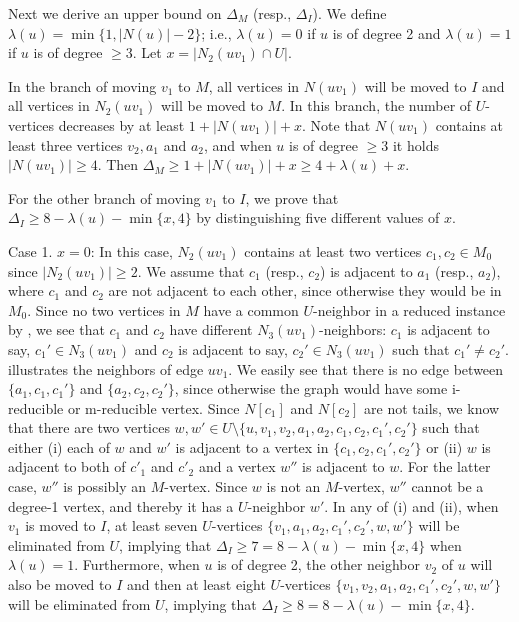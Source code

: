 \documentclass{elsart_TR2}
\begin{document}
Next we derive an upper bound on  $\Delta_M$ (resp., $\Delta_I$).
We define $\lambda(u)=\min\{1, |N(u)|-2\}$; i.e.,  $\lambda(u)= 0$ if $u$ is of degree 2
 and $\lambda(u)=1$ if $u$ is of degree $\geq 3$.
Let $x=|N_2(uv_1)\cap U|$.

In the branch of moving $v_1$ to $M$,  all vertices in $N(uv_1)$
will be moved to $I$ and all vertices in $N_2(uv_1)$ will be moved to $M$.
In this branch, the number of $U$-vertices decreases by at least $1+|N(uv_1)|+x$.
Note that $N(uv_1)$ contains at least three vertices $v_2, a_1$ and $a_2$,
and when $u$ is  of degree $\geq3$ it holds $|N(uv_1)|\geq 4$.
Then  $\Delta_M\geq 1+|N(uv_1)|+x\geq 4+\lambda(u)+x$.


For the other branch of moving $v_1$ to $I$, we prove that
$\Delta_I\geq 8-\lambda(u)-\min\{x,4\} $
 by distinguishing five different values of $x$.


Case 1. $x=0$: In this case, $N_2(uv_1)$ contains at least two vertices $c_1,c_2\in M_0$ since $|N_2(uv_1)|\geq 2$.
We assume that $c_1$ (resp., $c_2$) is adjacent to $a_1$ (resp., $a_2$),
where  $c_1$ and $c_2$ are not adjacent to each other, since otherwise they would be in $M_0$.
Since  no two vertices in $M$  have a common $U$-neighbor in a reduced instance by ,
we see that $c_1$ and $c_2$ have different $N_3(uv_1)$-neighbors:  $c_1$ is adjacent to say, $c_1'\in N_3(uv_1)$
 and $c_2$ is adjacent to say, $c_2'\in N_3(uv_1)$ such that $c_1'\neq c_2'$.
 illustrates the neighbors of edge $uv_1$.
We easily see that there is no edge between $\{a_1,c_1,c_1'\}$ and $\{a_2,c_2,c_2'\}$, since otherwise
 the graph would have  some i-reducible or m-reducible vertex.
Since $N[c_1]$ and $N[c_2]$ are not tails, we know that there are two vertices $w,w'\in U\setminus \{u,v_1,v_2,a_1,a_2,c_1,c_2,c_1',c_2'\}$ such that either
(i) each of $w$ and $w'$ is adjacent to a vertex in $\{c_1,c_2,c_1',c_2'\}$ or
(ii) $w$ is adjacent to both of $c'_1$ and $c'_2$ and a vertex $w''$ is adjacent to $w$.
For the latter case, $w''$ is possibly an $M$-vertex.
Since $w$ is not an $M$-vertex, $w''$ cannot be
a degree-1 vertex, and thereby it has a $U$-neighbor $w'$.
In any of (i) and (ii), when $v_1$ is moved to $I$, at least seven $U$-vertices $\{v_1,a_1,a_2,c_1',c_2',w,w'\}$ will be eliminated from $U$, implying that $\Delta_I\geq 7=8-\lambda(u)-\min\{x,4\}$ when $\lambda(u)=1$.
Furthermore, when $u$ is of degree 2, the other neighbor $v_2$ of $u$ will also be moved to $I$ and
then at least eight $U$-vertices $\{v_1,v_2,a_1,a_2,c_1',c_2',w,w'\}$ will be eliminated from $U$,
 implying that $\Delta_I\geq 8=8-\lambda(u) -\min\{x,4\}$.
\end{document}
